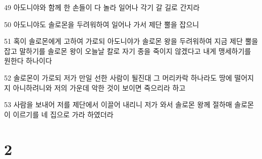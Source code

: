 \par 49 아도니야와 함께 한 손들이 다 놀라 일어나 각기 갈 길로 간지라
\par 50 아도니야도 솔로몬을 두려워하여 일어나 가서 제단 뿔을 잡으니
\par 51 혹이 솔로몬에게 고하여 가로되 아도니야가 솔로몬 왕을 두려워하여 지금 제단 뿔을 잡고 말하기를 솔로몬 왕이 오늘날 칼로 자기 종을 죽이지 않겠다고 내게 맹세하기를 원한다 하나이다
\par 52 솔로몬이 가로되 저가 만일 선한 사람이 될진대 그 머리카락 하나라도 땅에 떨어지지 아니하려니와 저의 가운데 악한 것이 보이면 죽으리라 하고
\par 53 사람을 보내어 저를 제단에서 이끌어 내리니 저가 와서 솔로몬 왕께 절하매 솔로몬이 이르기를 네 집으로 가라 하였더라

\chapter{2}

